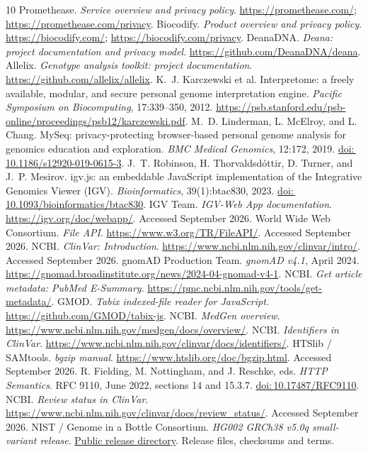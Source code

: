 \documentclass[10pt,twocolumn,letterpaper]{article}
\newcommand{\doi}[1]{\href{https://doi.org/#1}{doi:\,#1}}
\begin{document}
\balance
\begin{thebibliography}{10}
\small
\setlength{\itemsep}{3pt}
\setlength{\parskip}{0pt}
 Promethease. \emph{Service overview and privacy policy}. \url{https://promethease.com/}; \url{https://promethease.com/privacy}.
 Biocodify. \emph{Product overview and privacy policy}. \url{https://biocodify.com/}; \url{https://biocodify.com/privacy}.
 DeanaDNA. \emph{Deana: project documentation and privacy model}. \url{https://github.com/DeanaDNA/deana}.
 Allelix. \emph{Genotype analysis toolkit: project documentation}. \url{https://github.com/allelix/allelix}.
 K.~J. Karczewski et al. Interpretome: a freely available, modular, and secure personal genome interpretation engine. \emph{Pacific Symposium on Biocomputing}, 17:339--350, 2012. \url{https://psb.stanford.edu/psb-online/proceedings/psb12/karczewski.pdf}.
 M.~D. Linderman, L. McElroy, and L. Chang. MySeq: privacy-protecting browser-based personal genome analysis for genomics education and exploration. \emph{BMC Medical Genomics}, 12:172, 2019. \doi{10.1186/s12920-019-0615-3}.
 J.~T. Robinson, H. Thorvaldsd\'{o}ttir, D. Turner, and J.~P. Mesirov. igv.js: an embeddable JavaScript implementation of the Integrative Genomics Viewer (IGV). \emph{Bioinformatics}, 39(1):btac830, 2023. \doi{10.1093/bioinformatics/btac830}.
 IGV Team. \emph{IGV-Web App documentation}. \url{https://igv.org/doc/webapp/}. Accessed September 2026.
 World Wide Web Consortium. \emph{File API}. \url{https://www.w3.org/TR/FileAPI/}. Accessed September 2026.
 NCBI. \emph{ClinVar: Introduction}. \url{https://www.ncbi.nlm.nih.gov/clinvar/intro/}. Accessed September 2026.
 gnomAD Production Team. \emph{gnomAD v4.1}, April 2024. \url{https://gnomad.broadinstitute.org/news/2024-04-gnomad-v4-1}.
 NCBI. \emph{Get article metadata: PubMed E-Summary}. \url{https://pmc.ncbi.nlm.nih.gov/tools/get-metadata/}.
 GMOD. \emph{Tabix indexed-file reader for JavaScript}. \url{https://github.com/GMOD/tabix-js}.
 NCBI. \emph{MedGen overview}. \url{https://www.ncbi.nlm.nih.gov/medgen/docs/overview/}.
 NCBI. \emph{Identifiers in ClinVar}. \url{https://www.ncbi.nlm.nih.gov/clinvar/docs/identifiers/}.
 HTSlib / SAMtools. \emph{bgzip manual}. \url{https://www.htslib.org/doc/bgzip.html}. Accessed September 2026.
 R. Fielding, M. Nottingham, and J. Reschke, eds. \emph{HTTP Semantics}. RFC 9110, June 2022, sections 14 and 15.3.7. \doi{10.17487/RFC9110}.
 NCBI. \emph{Review status in ClinVar}. \url{https://www.ncbi.nlm.nih.gov/clinvar/docs/review_status/}. Accessed September 2026.
 NIST / Genome in a Bottle Consortium. \emph{HG002 GRCh38 v5.0q small-variant release}. \href{https://ftp-trace.ncbi.nlm.nih.gov/ReferenceSamples/giab/release/AshkenazimTrio/HG002_NA24385_son/v5.0q/}{Public release directory}. Release files, checksums and terms.
\end{thebibliography}
\end{document}
